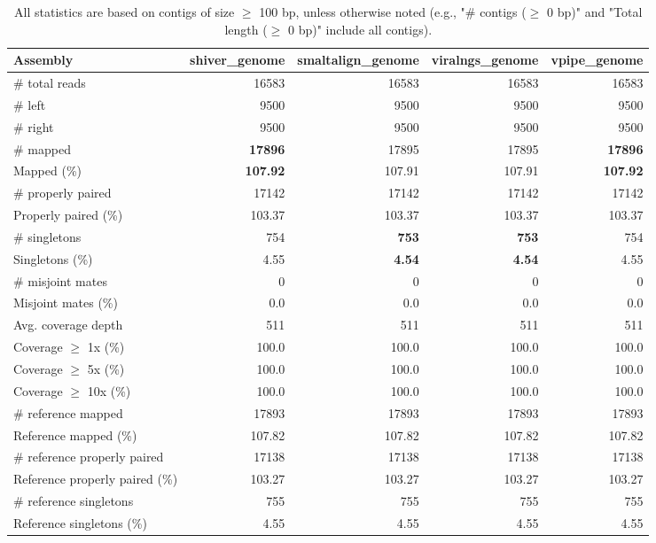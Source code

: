 \documentclass[12pt,a4paper]{article}
\begin{document}
\begin{table}[ht]
\begin{center}
\caption{All statistics are based on contigs of size $\geq$ 100 bp, unless otherwise noted (e.g., "\# contigs ($\geq$ 0 bp)" and "Total length ($\geq$ 0 bp)" include all contigs).}
\begin{tabular}{|l*{4}{|r}|}
\hline
Assembly & shiver\_genome & smaltalign\_genome & viralngs\_genome & vpipe\_genome \\ \hline
\# total reads & 16583 & 16583 & 16583 & 16583 \\ \hline
\# left & 9500 & 9500 & 9500 & 9500 \\ \hline
\# right & 9500 & 9500 & 9500 & 9500 \\ \hline
\# mapped & {\bf 17896} & 17895 & 17895 & {\bf 17896} \\ \hline
Mapped (\%) & {\bf 107.92} & 107.91 & 107.91 & {\bf 107.92} \\ \hline
\# properly paired & 17142 & 17142 & 17142 & 17142 \\ \hline
Properly paired (\%) & 103.37 & 103.37 & 103.37 & 103.37 \\ \hline
\# singletons & 754 & {\bf 753} & {\bf 753} & 754 \\ \hline
Singletons (\%) & 4.55 & {\bf 4.54} & {\bf 4.54} & 4.55 \\ \hline
\# misjoint mates & 0 & 0 & 0 & 0 \\ \hline
Misjoint mates (\%) & 0.0 & 0.0 & 0.0 & 0.0 \\ \hline
Avg. coverage depth & 511 & 511 & 511 & 511 \\ \hline
Coverage $\geq$ 1x (\%) & 100.0 & 100.0 & 100.0 & 100.0 \\ \hline
Coverage $\geq$ 5x (\%) & 100.0 & 100.0 & 100.0 & 100.0 \\ \hline
Coverage $\geq$ 10x (\%) & 100.0 & 100.0 & 100.0 & 100.0 \\ \hline
\# reference mapped & 17893 & 17893 & 17893 & 17893 \\ \hline
Reference mapped (\%) & 107.82 & 107.82 & 107.82 & 107.82 \\ \hline
\# reference properly paired & 17138 & 17138 & 17138 & 17138 \\ \hline
Reference properly paired (\%) & 103.27 & 103.27 & 103.27 & 103.27 \\ \hline
\# reference singletons & 755 & 755 & 755 & 755 \\ \hline
Reference singletons (\%) & 4.55 & 4.55 & 4.55 & 4.55 \\ \hline

\end{tabular}
\end{center}
\end{table}
\end{document}
